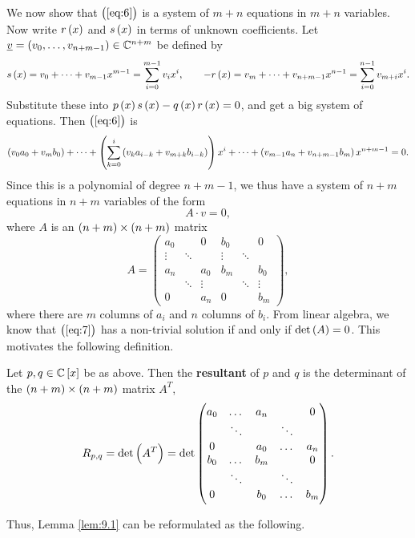 We now show that $ \br{\ref{eq:6}} $ is a system of $ m + n $ equations in $ m + n $ variables. Now write $ r\br{x} $ and $ s\br{x} $ in terms of unknown coefficients. Let $ \underline{v} = \br{v_0, \dots, v_{n + m - 1}} \in \C^{n + m} $ be defined by
$$ s\br{x} = v_0 + \dots + v_{m - 1}x^{m - 1} = \sum_{i = 0}^{m - 1} v_ix^i, \qquad -r\br{x} = v_m + \dots + v_{n + m - 1}x^{n - 1} = \sum_{i = 0}^{n - 1} v_{m + i}x^i. $$
Substitute these into $ p\br{x}s\br{x} - q\br{x}r\br{x} = 0 $, and get a big system of equations. Then $ \br{\ref{eq:6}} $ is
$$ \br{v_0a_0 + v_mb_0} + \dots + \br{\sum_{k = 0}^i \br{v_ka_{i - k} + v_{m + k}b_{i - k}}}x^i + \dots + \br{v_{m - 1}a_n + v_{n + m - 1}b_m}x^{n + m - 1} = 0. $$
Since this is a polynomial of degree $ n + m - 1 $, we thus have a system of $ n + m $ equations in $ n + m $ variables of the form
\begin{equation}
\label{eq:7}
A \cdot v = 0,
\end{equation}
where $ A $ is an $ \br{n + m} \times \br{n + m} $ matrix
$$ A =
\begin{pmatrix}
a_0 & & 0 & b_0 & & 0 \\
\vdots & \ddots & & \vdots & \ddots & \\
a_n & & a_0 & b_m & & b_0 \\
& \ddots & \vdots & & \ddots & \vdots \\
0 & & a_n & 0 & & b_m
\end{pmatrix},
$$
where there are $ m $ columns of $ a_i $ and $ n $ columns of $ b_i $. From linear algebra, we know that $ \br{\ref{eq:7}} $ has a non-trivial solution if and only if $ \det\br{A} = 0 $. This motivates the following definition.

\begin{definition}
Let $ p, q \in \C\sbr{x} $ be as above. Then the \textbf{resultant} of $ p $ and $ q $ is the determinant of the $ \br{n + m} \times \br{n + m} $ matrix $ A^T $,
$$ R_{p, q} = \det\br{A^T} = \det
\begin{pmatrix}
a_0 & \dots & a_n & & 0 \\
& \ddots & & \ddots & \\
0 & & a_0 & \dots & a_n \\
b_0 & \dots & b_m & & 0 \\
& \ddots & & \ddots & \\
0 & & b_0 & \dots & b_m
\end{pmatrix}.
$$
\end{definition}

Thus, Lemma \ref{lem:9.1} can be reformulated as the following.

